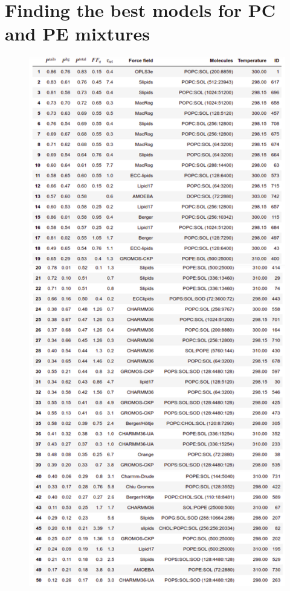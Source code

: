 \documentclass[fleqn,10pt]{wlscirepSI}
\begin{document}
\pagebreak
\section{Finding the best models for PC and PE mixtures}

\begin{figure}[!h]
    \centering
    \includegraphics[height = 0.8\textheight]{Figures/totalrankingCOMPL.pdf}

\end{figure}
\end{document}
